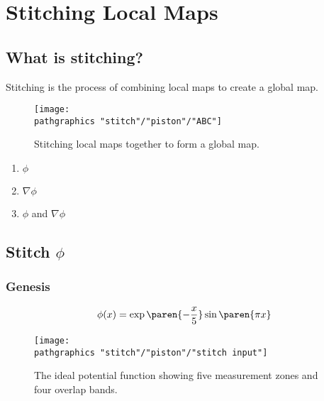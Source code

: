 \chapter{Stitching Local Maps}

\section{What is stitching?}      %
Stitching is the process of combining local maps to create a global map.

\begin{figure}[htbp] %
   \centering
   \texttt{[image: \\pathgraphics "stitch"/"piston"/"ABC"]} 
   \caption{Stitching local maps together to form a global map.}
\end{figure}

  \begin{enumerate}
    \item $\phi$
    \item $\nabla \phi$
    \item $\phi$ and $\nabla \phi$
  \end{enumerate}

\section{Stitch $\phi$} %
  \subsection{Genesis}  %

  \begin{equation*}   %
    \phi(x) = \exp \paren{-\frac{x}{5}} \sin \paren{\pi x}  
    \label{eq:phi}
  \end{equation*}

\begin{figure}[htbp] %
   \centering
   \texttt{[image: \\pathgraphics "stitch"/"piston"/"stitch input"]} 
   \caption{The ideal potential function showing five measurement zones and four overlap bands.}
   \label{fig:example}
\end{figure}

